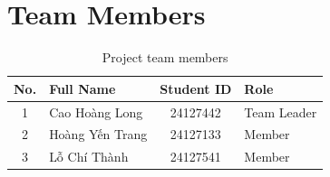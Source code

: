 \section{Team Members}

\begin{table}[h]
    \centering
    \renewcommand{\arraystretch}{1.3}
    \begin{tabular}{|c|l|c|l|}
        \hline
        \textbf{No.} & \textbf{Full Name} &
        \textbf{Student ID} & \textbf{Role} \\
        \hline
        1 & Cao Hoàng Long & 24127442 & Team Leader \\
        \hline
        2 & Hoàng Yến Trang & 24127133 & Member \\
        \hline
        3 & Lỗ Chí Thành & 24127541 & Member \\
        \hline
    \end{tabular}
    \caption{Project team members}
    \label{tab:team-members}
\end{table}
